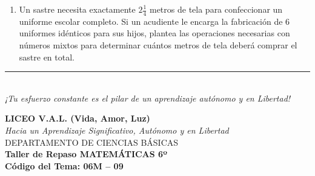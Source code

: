\documentclass[12pt, letterpaper]{article}
\begin{document}
\begin{enumerate}[itemsep=0.8cm]
		A partir de los datos de la tabla, responde:
		\begin{enumerate}[label=\alph*., itemsep=0.2cm, topsep=0.2cm]
			\item ¿Cuántos kilogramos de harina compró la cafetería en total sumando las tres variedades?
			\item Si al finalizar la semana sobraron $\displaystyle 1 \frac{1}{4}$ kg de Harina de Trigo, ¿cuántos kilogramos de este tipo específico de harina se consumieron en las recetas?
		\end{enumerate}
		
		\item Un sastre necesita exactamente $\displaystyle 2 \frac{1}{4}$ metros de tela para confeccionar un uniforme escolar completo. Si un acudiente le encarga la fabricación de $6$ uniformes idénticos para sus hijos, plantea las operaciones necesarias con números mixtos para determinar cuántos metros de tela deberá comprar el sastre en total.
		
	\end{enumerate}
	
	\vfill
	\begin{center}
		\rule{0.5\textwidth}{0.4pt} \\
		\vspace{0.2cm}
		\textit{¡Tu esfuerzo constante es el pilar de un aprendizaje autónomo y en Libertad!}
	\end{center}
	
	\newpage
	\begin{center}
		{\Large \textbf{LICEO V.A.L. (Vida, Amor, Luz)}}\\[0.1cm]
		{\normalsize \textit{Hacia un Aprendizaje Significativo, Autónomo y en Libertad}}\\[0.2cm]
		{\large DEPARTAMENTO DE CIENCIAS BÁSICAS}\\[0.1cm]
		\textbf{Taller de Repaso MATEMÁTICAS 6º}\\[0.1cm]
		\textbf{Código del Tema: 06M – 09}\\[0.1cm]
	\end{center}
	
\end{document}
